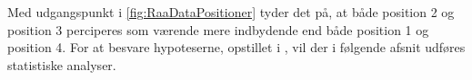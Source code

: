 \noindent
%
Med udgangspunkt i \autoref{fig:RaaDataPositioner} tyder det på, at både position 2 og position 3 perciperes som værende mere indbydende end både position 1 og position 4.\blankline
%
For at besvare hypoteserne, opstillet i , vil der i følgende afsnit udføres statistiske analyser.   


